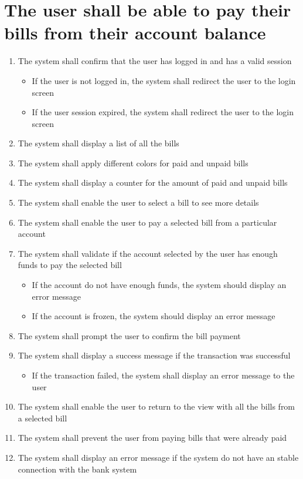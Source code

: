 \section{The user shall be able to pay their bills from their account balance}
\begin{enumerate}
    \item The system shall confirm that the user has logged in and has a 
    valid session
    \begin{itemize}
        \item If the user is not logged in, the system shall redirect the user 
        to the login screen
        \item If the user session expired, the system shall redirect the user 
        to the login screen
    \end{itemize}
    \item The system shall display a list of all the bills 
    \item The system shall apply different colors for paid and unpaid bills
    \item The system shall display a counter for the amount of paid and unpaid 
    bills
    \item The system shall enable the user to select a bill to see more details 
    \item The system shall enable the user to pay a selected bill from a 
    particular account
    \item The system shall validate if the account selected by the user has 
    enough funds to pay the selected bill
    \begin{itemize}
        \item If the account do not have enough funds, the system should 
        display an error message
	    \item If the account is frozen, the system should display an error 
        message
    \end{itemize}
    \item The system shall prompt the user to confirm the bill payment
    \item The system shall display a success message if the transaction was 
    successful 
    \begin{itemize}
        \item If the transaction failed, the system shall display an error 
        message to the user
    \end{itemize}
    \item The system shall enable the user to return to the view with all the 
    bills from a selected bill
    \pagebreak
    \item The system shall prevent the user from paying bills that were already 
    paid
    \item The system shall display an error message if the system do not have 
    an stable connection with the bank system
\end{enumerate}